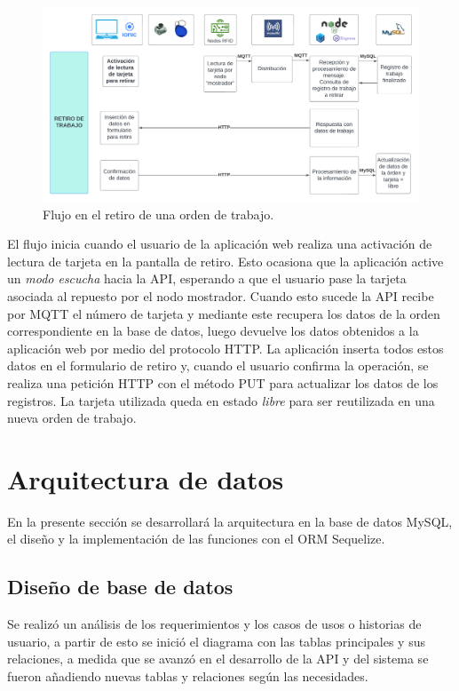\begin{figure}[ht]
	\centering
	\includegraphics[width=\textwidth]{./Figures/flujo-retiro.png}
	\caption{Flujo en el retiro de una orden de trabajo.}
	\label{fig:flujoretiro}
\end{figure}

El flujo inicia cuando el usuario de la aplicación web realiza una activación de lectura de tarjeta en la pantalla de retiro. Esto ocasiona que la aplicación active un \textit{modo escucha} hacia la API, esperando a que el usuario pase la tarjeta asociada al repuesto por el nodo mostrador. Cuando esto sucede la API recibe por MQTT el número de tarjeta y mediante este recupera los datos de la orden correspondiente en la base de datos, luego devuelve los datos obtenidos a la aplicación web por medio del protocolo HTTP. La aplicación inserta todos estos datos en el formulario de retiro y, cuando el usuario confirma la operación, se realiza una petición HTTP con el método PUT para actualizar los datos de los registros. La tarjeta utilizada queda en estado \textit{libre} para ser reutilizada en una nueva orden de trabajo.

\section{Arquitectura de datos}
\label{sec:arquitecturadatos}
En la presente sección se desarrollará la arquitectura en la base de datos MySQL, el diseño y la implementación de las funciones con el ORM Sequelize.

\subsection{Diseño de base de datos}
\label{subsec:diagramabasededatos}

Se realizó un análisis de los requerimientos y los casos de usos o historias de usuario, a partir de esto se inició el diagrama con las tablas principales y sus relaciones, a medida que se avanzó en el desarrollo de la API y del sistema  se fueron añadiendo nuevas tablas y relaciones según las necesidades.

